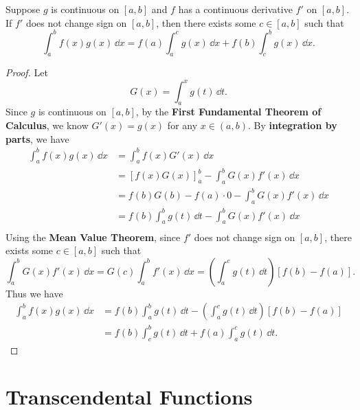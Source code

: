 \documentclass[a4paper]{ctexart}
\begin{document}
	\begin{mythm}
		Suppose $g$ is continuous on $[a,b]$ and $f$ has a continuous derivative $f'$ on $[a,b]$.  If $f'$ does not change sign on $[a,b]$, then there exists some $c\in [a,b]$ such that
		\[
		\int_a^b f(x) g(x)\, \dd x = f(a) \int_a^c g(x)\, \dd x + f(b) \int_c^b g(x)\, \dd x.
		\]
	\end{mythm}
	\begin{proof}
		Let
		\[
		G(x) = \int_a^x g(t)\, \dd t.
		\]
		Since $g$ is continuous on $[a,b]$, by the \textbf{First Fundamental Theorem of Calculus}, we know $G'(x)=g(x)$ for any $x\in (a,b)$. By \textbf{integration by parts}, we have
		\[
		\begin{aligned}
			\int_a^b f(x) g(x)\, \dd x &= \int_a^b f(x) G'(x)\, \dd x\\[6pt]
			&= \left[ f(x) G(x) \right]_a^b - \int_a^b G(x) f'(x)\, \dd x\\[6pt]
			&= f(b) G(b) - f(a) \cdot 0 - \int_a^b G(x) f'(x)\, \dd x\\[6pt]
			&= f(b) \int_a^b g(t)\, \dd t - \int_a^b G(x) f'(x)\, \dd x\\[6pt]
		\end{aligned}
		\]
		Using the \textbf{Mean Value Theorem}, since $f'$ does not change sign on $[a,b]$, there exists some $c\in [a,b]$ such that
		\[
		\int_a^b G(x) f'(x)\, \dd x = G(c) \int_a^b f'(x)\, \dd x =  \left( \int_a^c g(t)\, \dd t \right) [f(b)-f(a)].
		\]
		Thus we have
		\[
		\begin{aligned}
			\int_a^b f(x) g(x)\, \dd x &= f(b) \int_a^b g(t)\, \dd t - \left( \int_a^c g(t)\, \dd t \right) [f(b)-f(a)]\\[6pt]
			&= f(b) \int_c^b g(t)\, \dd t + f(a) \int_a^c g(t)\, \dd t.
		\end{aligned}
		\]
	\end{proof}

	\newpage
	\section{Transcendental Functions}
\end{document}

